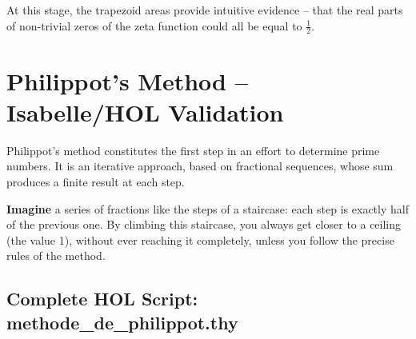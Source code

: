 \documentclass[a4paper,11pt]{article}
\newenvironment{resume}{%
    \begin{tcolorbox}[colback=purple!5,colframe=holpurple,title={\textbf{Visual Summary}}]
}{%
    \end{tcolorbox}
}
\begin{document}
\begin{resume}
At this stage, the trapezoid areas provide intuitive evidence -- that the real parts of non-trivial zeros of the zeta function could all be equal to $\frac{1}{2}$.
\end{resume}

\newpage
\section{Philippot's Method -- Isabelle/HOL Validation}

Philippot's method constitutes the first step in an effort to determine prime numbers. It is an iterative approach, based on fractional sequences, whose sum produces a finite result at each step.

\begin{resume}
\textbf{Imagine} a series of fractions like the steps of a staircase: each step is exactly half of the previous one. By climbing this staircase, you always get closer to a ceiling (the value 1), without ever reaching it completely, unless you follow the precise rules of the method.
\end{resume}

\subsection{Complete HOL Script: methode\_de\_philippot.thy}
\end{document}
